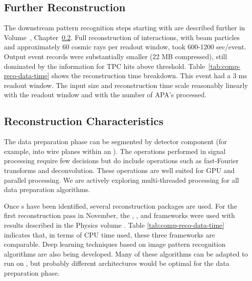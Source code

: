 \subsection{Further Reconstruction}
The downstream pattern recognition steps starting with  are described further in %
Volume~\volnumberphysics, Chapter~\ref{}.  
Full reconstruction of  interactions, with beam particles and approximately 60 cosmic rays per readout window, took 600-1200 sec/event. Output event records were substantially smaller (22 MB compressed), still dominated by the information for TPC hits above threshold. 
Table~\ref{tab:comp-reco-data-time} shows the reconstruction time breakdown.  This event had a 3 ms readout window.  The input size and reconstruction time scale reasonably linearly with the readout window and with the number of APA's processed. 

\subsection{Reconstruction Characteristics}

The data preparation phase can be segmented by detector component (for example, into wire planes within an ).  The operations performed in signal processing require few decisions but do include operations such as fast-Fourier transforms and deconvolution.  These operations are well suited for GPU and parallel processing. We are actively exploring multi-threaded processing for all data preparation algorithms.


Once s have been identified, several \threed  reconstruction packages are used. For the first reconstruction pass in November, the  \cite{Acciarri:2017hat}, \cite{wirecell}, and \cite{ref:PMA}  frameworks were used with results described in the Physics volume .   Table \ref{tab:comp-reco-data-time} indicates that, in terms of CPU time used, these three frameworks are comparable.   Deep learning techniques based on image pattern recognition algorithms are also being developed. Many of these algorithms can be adapted to run on , but probably different architectures would be optimal for the data preparation phase. 

